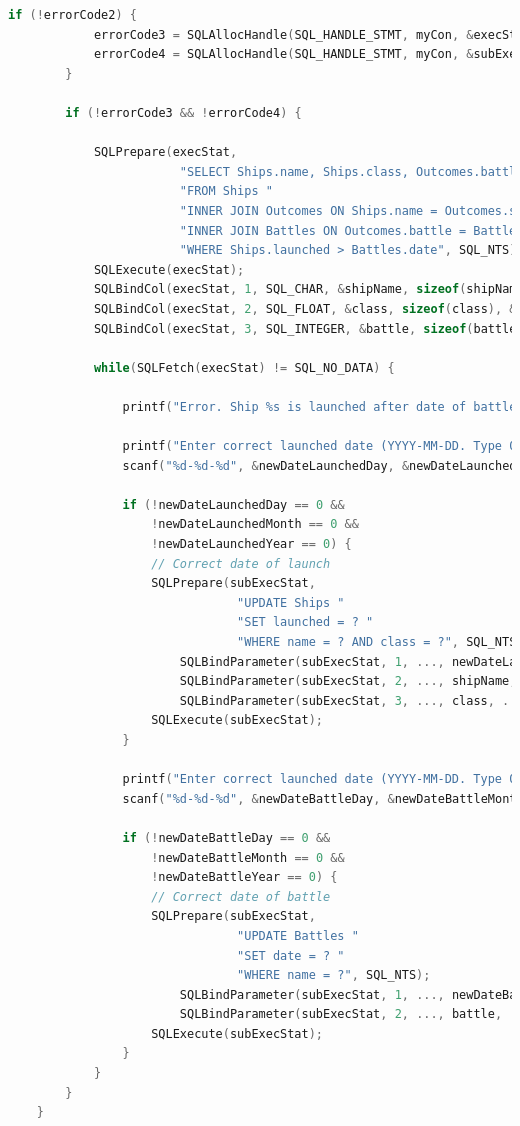 \documentclass[12pt]{article}
\begin{document}
\begin{enumerate}[1.]
\begin{enumerate}[a)]
\begin{lstlisting}[language=c]
        if (!errorCode2) {
            errorCode3 = SQLAllocHandle(SQL_HANDLE_STMT, myCon, &execStat);
            errorCode4 = SQLAllocHandle(SQL_HANDLE_STMT, myCon, &subExecStat);
        }

        if (!errorCode3 && !errorCode4) {

            SQLPrepare(execStat,
                        "SELECT Ships.name, Ships.class, Outcomes.battle"
                        "FROM Ships "
                        "INNER JOIN Outcomes ON Ships.name = Outcomes.ship "
                        "INNER JOIN Battles ON Outcomes.battle = Battles.name "
                        "WHERE Ships.launched > Battles.date", SQL_NTS);
            SQLExecute(execStat);
            SQLBindCol(execStat, 1, SQL_CHAR, &shipName, sizeof(shipName), &shipNameInfo);
            SQLBindCol(execStat, 2, SQL_FLOAT, &class, sizeof(class), &classInfo);
            SQLBindCol(execStat, 3, SQL_INTEGER, &battle, sizeof(battle), &battleInfo);

            while(SQLFetch(execStat) != SQL_NO_DATA) {

                printf("Error. Ship %s is launched after date of battle.\n");

                printf("Enter correct launched date (YYYY-MM-DD. Type 0-0-0 to skip):\n");
                scanf("%d-%d-%d", &newDateLaunchedDay, &newDateLaunchedMonth, &newDateLaunchedYear);

                if (!newDateLaunchedDay == 0 &&
                    !newDateLaunchedMonth == 0 &&
                    !newDateLaunchedYear == 0) {
                    // Correct date of launch
                    SQLPrepare(subExecStat,
                                "UPDATE Ships "
                                "SET launched = ? "
                                "WHERE name = ? AND class = ?", SQL_NTS);
                        SQLBindParameter(subExecStat, 1, ..., newDateLaunched, ...);
                        SQLBindParameter(subExecStat, 2, ..., shipName, ...);
                        SQLBindParameter(subExecStat, 3, ..., class, ...);
                    SQLExecute(subExecStat);
                }

                printf("Enter correct launched date (YYYY-MM-DD. Type 0-0-0 to skip):\n");
                scanf("%d-%d-%d", &newDateBattleDay, &newDateBattleMonth, &newDateBattleYear);

                if (!newDateBattleDay == 0 &&
                    !newDateBattleMonth == 0 &&
                    !newDateBattleYear == 0) {
                    // Correct date of battle
                    SQLPrepare(subExecStat,
                                "UPDATE Battles "
                                "SET date = ? "
                                "WHERE name = ?", SQL_NTS);
                        SQLBindParameter(subExecStat, 1, ..., newDateBattle, ...);
                        SQLBindParameter(subExecStat, 2, ..., battle, ...);
                    SQLExecute(subExecStat);
                }
            }
        }
    }
    \end{lstlisting}


\end{enumerate}
\end{enumerate}
\end{document}
